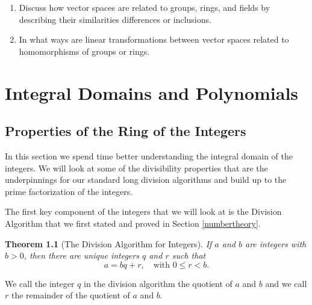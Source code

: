 \documentclass[
]{book}
\providecommand{\tightlist}{%
  \setlength{\itemsep}{0pt}\setlength{\parskip}{0pt}}
\newtheorem{theorem}{Theorem}[chapter]
\theoremstyle{definition}
\theoremstyle{definition}
\theoremstyle{definition}
\theoremstyle{definition}
\theoremstyle{remark}
\begin{document}
\begin{enumerate}
  \begin{enumerate}
  \def\labelenumii{\alph{enumii}.}
  \tightlist
  \item
    Discuss how vector spaces are related to groups, rings, and fields by describing their similarities differences or inclusions.
  \item
    In what ways are linear transformations between vector spaces related to homomorphisms of groups or rings.
  \end{enumerate}
\end{enumerate}

\hypertarget{rings}{%
\chapter{Integral Domains and Polynomials}\label{rings}}

\hypertarget{Integer-Ring}{%
\section{Properties of the Ring of the Integers}\label{Integer-Ring}}

In this section we spend time better understanding the integral domain of the integers. We will look at some of the divisibility properties that are the underpinnings for our standard long division algorithms and build up to the prime factorization of the integers.

The first key component of the integers that we will look at is the Division Algorithm that we first stated and proved in Section \ref{numbertheory}.

\begin{theorem}[The Division Algorithm for Integers]
\protect\hypertarget{thm:division-algorithm}{}\label{thm:division-algorithm}If \(a\) and \(b\) are integers with \(b>0\), then there are unique integers \(q\) and \(r\) such that \[a=bq+r, \quad \mbox{with } 0\leq r <b.\]
\end{theorem}

We call the integer \(q\) in the division algorithm the quotient of \(a\) and \(b\) and we call \(r\) the remainder of the quotient of \(a\) and \(b\).
\end{document}
